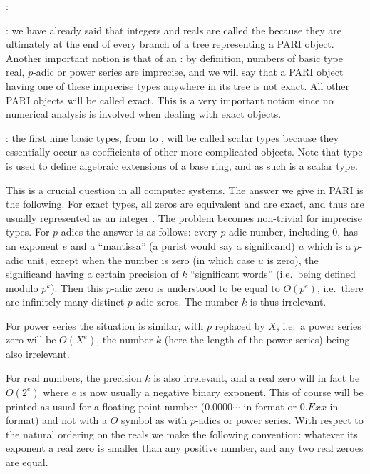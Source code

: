 :

: we have
already said that integers and reals are called the  because they
are ultimately at the end of every branch of a tree representing a PARI
object. Another important notion is that of an {\bf {}}: by
definition, numbers of basic type real, $p$-adic or power series are
imprecise, and we will say that a PARI object having one of these imprecise
types anywhere in its tree is not exact. All other PARI objects will be
called exact. This is a very important notion since no numerical analysis is
involved when dealing with exact objects.

: the first nine basic types, from
 to , will be called scalar types because they
essentially occur as coefficients of other more complicated objects. Note
that type  is used to define algebraic extensions of a base ring,
and as such is a scalar type.

 This is a crucial question in all computer
systems. The answer we give in PARI is the following. For exact types, all
zeros are equivalent and are exact, and thus are usually represented as an
integer . The problem becomes non-trivial for imprecise types. For
$p$-adics the answer is as follows: every $p$-adic number, including 0, has
an exponent $e$ and a ``mantissa'' (a purist would say a significand) $u$
which is a $p$-adic unit, except when the number is zero (in which case $u$
is zero), the significand having a certain precision of $k$ ``significant
words'' (i.e.~being defined modulo $p^k$). Then this $p$-adic zero is
understood to be equal to $O(p^e)$, i.e.~there are infinitely many distinct
$p$-adic zeros. The number $k$ is thus irrelevant.

For power series the situation is similar, with $p$ replaced by $X$, i.e.~a
power series zero will be $O(X^e)$, the number $k$ (here the length of the
power series) being also irrelevant.\label{se:whatzero}

For real numbers, the precision $k$ is also irrelevant, and a real zero will
in fact be $O(2^e)$ where $e$ is now usually a negative binary exponent. This
of course will be printed as usual for a floating point number
($0.0000\cdots$ in  format or $0.Exx$ in  format) and not with
a $O$ symbol as with $p$-adics or power series. With respect to the natural
ordering on the reals we make the following convention: whatever its exponent
a real zero is smaller than any positive number, and any two real zeroes are
equal.

